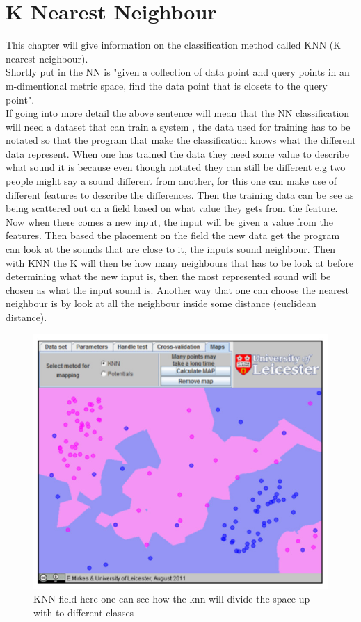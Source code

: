 \section{K Nearest Neighbour}
This chapter will give information on the classification method called KNN (K nearest neighbour).\\
Shortly put in \citep{meaningfulNN} the NN is "given a collection of data point and query points in an m-dimentional metric space, find the data point that is closets to the query point".\\
If going into more detail the above sentence will mean that the NN classification will need a dataset that can train a system \citep{Sinoyr05}, the data used for training has to be notated so that the program that make the classification knows what the different data represent. When one has trained the data they need some value to describe what sound it is  because even though notated they can still be different e.g two people might say a sound different from another, for this one can make use of different features to describe the differences. Then the training data can be see as being scattered out on a field based on what value they gets from the feature. Now when there comes a new input, the input will be given a value from the features. Then based the placement on the field the new data get the program can look at the sounds that are close to it, the inputs sound neighbour. Then with KNN the K will then be how many neighbours that has to be look at before determining what the new input is, then the most represented sound will be chosen as what the input sound is\citep{introKNN}. Another way that one can choose the nearest neighbour is by look at all the neighbour inside some distance (euclidean distance)\citep{NNHD}.

\begin{figure}[h]
	\begin{center}
		\includegraphics[scale = 0.5]{fig/KNNfig.jpg}
		\caption{KNN field here one can see how the knn will divide the space up with to different classes \citep{introKNN}}
		\label{KNN fig}
	\end{center}
\end{figure}
